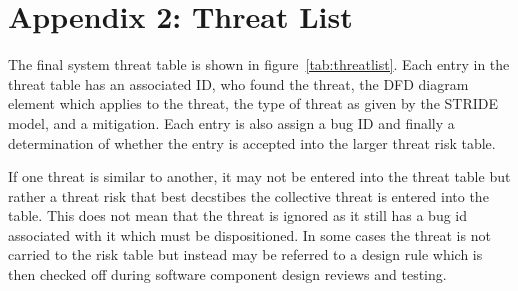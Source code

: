 \cleardoublepage
\chapter{Appendix 2: Threat List}
\label{ch:threatlist}

The final system threat table is shown in figure~\ref{tab:threatlist}.  Each entry in the threat table has an associated ID, who found the threat, the DFD diagram element which applies to the threat, the type of threat as given by the STRIDE model, and a mitigation.  Each entry is also assign a bug ID and finally a determination of whether the entry is accepted into the larger threat risk table.  
\par
If one threat is similar to another, it may not be entered into the threat table but rather a threat risk that best decstibes the collective threat is entered into the table.  This does not mean that the threat is ignored as it still has a bug id associated with it which must be dispositioned.  In some cases the threat is not carried to the risk table but instead may be referred to a design rule which is then checked off during software component design reviews and testing.


